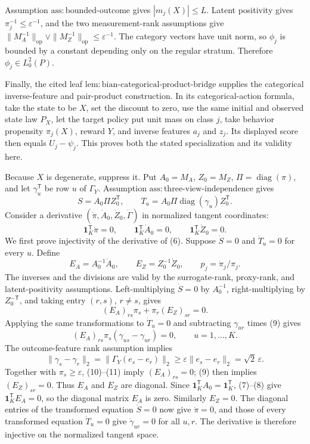 Assumption \(\mathrm{ass{:}bounded\mbox{-}outcome}\) gives \(|m_j(X)|\leq L\).  Latent positivity gives \(\pi_j^{-1}\leq\varepsilon^{-1}\), and the two measurement-rank assumptions give
\(\|M_A^{-1}\|_{\mathrm{op}}\vee\|M_Z^{-1}\|_{\mathrm{op}}\leq\varepsilon^{-1}\).
The category vectors have unit norm, so \(\phi_j\) is bounded by a constant depending only on the regular stratum.  Therefore \(\phi_j\in L^2_0(P)\).

Finally, the cited leaf \(\mathrm{lem{:}bian\mbox{-}categorical\mbox{-}product\mbox{-}bridge}\) supplies the categorical inverse-feature and pair-product construction.  In its categorical-action formula, take the state to be \(X\), set the discount to zero, use the same initial and observed state law \(P_X\), let the target policy put unit mass on class \(j\), take behavior propensity \(\pi_j(X)\), reward \(Y\), and inverse features \(a_j\) and \(z_j\).  Its displayed score then equals \(U_j-\psi_j\).  This proves both the stated specialization and its validity here.

Because \(X\) is degenerate, suppress it.  Put \(A_0=M_A\), \(Z_0=M_Z\), \(\Pi=\operatorname{diag}(\pi)\), and let \(\gamma_u^{\mathsf T}\) be row \(u\) of \(\Gamma_Y\).  Assumption \(\mathrm{ass{:}three\mbox{-}view\mbox{-}independence}\) gives
\[
 S=A_0\Pi Z_0^{\mathsf T},\qquad
 T_u=A_0\Pi\operatorname{diag}(\gamma_u)Z_0^{\mathsf T}. \tag{6}
\]
Consider a derivative \((\dot\pi,\dot A_0,\dot Z_0,\dot\Gamma)\) in normalized tangent coordinates:
\[
 \mathbf 1_K^{\mathsf T}\dot\pi=0,\qquad
 \mathbf 1_K^{\mathsf T}\dot A_0=0,\qquad
 \mathbf 1_K^{\mathsf T}\dot Z_0=0. \tag{7}
\]
We first prove injectivity of the derivative of (6).  Suppose \(\dot S=0\) and \(\dot T_u=0\) for every \(u\).  Define
\[
 E_A=A_0^{-1}\dot A_0,\qquad E_Z=Z_0^{-1}\dot Z_0,
 \qquad p_j=\dot\pi_j/\pi_j. \tag{8}
\]
The inverses and the divisions are valid by the surrogate-rank, proxy-rank, and latent-positivity assumptions.  Left-multiplying \(\dot S=0\) by \(A_0^{-1}\), right-multiplying by \(Z_0^{-\mathsf T}\), and taking entry \((r,s)\), \(r\ne s\), gives
\[
 (E_A)_{rs}\pi_s+\pi_r(E_Z)_{sr}=0. \tag{9}
\]
Applying the same transformations to \(\dot T_u=0\) and subtracting \(\gamma_{ur}\) times (9) gives
\[
 (E_A)_{rs}\pi_s(\gamma_{us}-\gamma_{ur})=0,
 \qquad u=1,\ldots,K. \tag{10}
\]
The outcome-feature rank assumption implies
\[
 \|\gamma_s-\gamma_r\|_2
 =\|\Gamma_Y(e_s-e_r)\|_2
 \geq\varepsilon\|e_s-e_r\|_2=\sqrt 2\,\varepsilon. \tag{11}
\]
Together with \(\pi_s\geq\varepsilon\), (10)--(11) imply \((E_A)_{rs}=0\); (9) then implies \((E_Z)_{sr}=0\).  Thus \(E_A\) and \(E_Z\) are diagonal.  Since \(\mathbf 1_K^{\mathsf T}A_0=\mathbf 1_K^{\mathsf T}\), (7)--(8) give \(\mathbf 1_K^{\mathsf T}E_A=0\), so the diagonal matrix \(E_A\) is zero.  Similarly \(E_Z=0\).  The diagonal entries of the transformed equation \(\dot S=0\) now give \(\dot\pi=0\), and those of every transformed equation \(\dot T_u=0\) give \(\dot\gamma_{ur}=0\) for all \(u,r\).  The derivative is therefore injective on the normalized tangent space.

